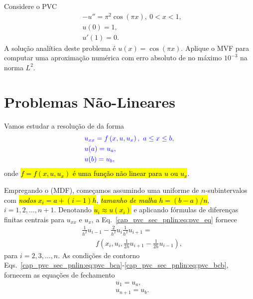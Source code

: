 \begin{exer}
  Considere o PVC
  \begin{align}
    &-u'' = \pi^2\cos(\pi x), ~0 < x < 1,\\
    &u(0) = 1,\\
    &u'(1) = 0.
  \end{align}
  A solução analítica deste problema é $u(x) = \cos(\pi x)$. Aplique o MVF para computar uma aproximação numérica com erro absoluto de no máximo $10^{-3}$ na norma $L^2$.
\end{exer}

\section{Problemas Não-Lineares}\label{cap_pvc_sec_pnlin}

Vamos estudar a resolução de  da forma
\begin{subequations}\label{cap_pvc_sec_pnlin:eq:pvc}\hleq
  \begin{align}
    &u_{xx} = f\left(x, u, u_x\right), ~a \leq x \leq b,\label{cap_pvc_sec_pnlin:eq:pvc_eq}\\
    &u(a) = u_a,\label{cap_pvc_sec_pnlin:eq:pvc_bca}\\
    &u(b) = u_b,\label{cap_pvc_sec_pnlin:eq:pvc_bcb}
  \end{align}
\end{subequations}
onde \hl{$f = f(x, u, u_x)$ é uma função não linear para $u$ ou $u_x$}.

Empregando o  (MDF), começamos assumindo uma  uniforme de $n$-subintervalos com \hl{\emph{nodos} $x_i = a + (i-1)h$}, \hl{\emph{tamanho de malha} $h = (b-a)/n$}, $i = 1, 2, \dotsc, n+1$. Denotando \hl{$u_i \approx u(x_i)$} e aplicando fórmulas de diferenças finitas centrais para $u_{xx}$ e $u_x$, a Eq.~\eqref{cap_pvc_sec_pnlin:eq:pvc_eq} fornece
\begin{equation}
  \begin{aligned}
    &\frac{1}{h^2}u_{i-1} - \frac{2}{h^2}u_i \frac{1}{h^2}u_{i+1} =\\
    &\quad\quad f\left(x_i, u_i, \frac{1}{2h}u_{i+1}-\frac{1}{2h}u_{i-1}\right),
  \end{aligned}
\end{equation}
para $i = 2, 3, \dotsc, n$. As condições de contorno Eqs.~\eqref{cap_pvc_sec_pnlin:eq:pvc_bca}-\eqref{cap_pvc_sec_pnlin:eq:pvc_bcb}, fornecem as equações de fechamento
\begin{subequations}
  \begin{align}
    &u_1 = u_a,\\
    &u_{n+1} = u_b.
  \end{align}
\end{subequations}


